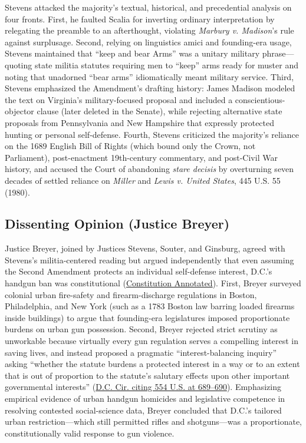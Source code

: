 \documentclass[12pt]{article}
\begin{document}
Stevens attacked the majority's textual, historical, and precedential analysis on four fronts. First, he faulted Scalia for inverting ordinary interpretation by relegating the preamble to an afterthought, violating \textit{Marbury v. Madison}'s rule against surplusage. Second, relying on linguistics amici and founding-era usage, Stevens maintained that ``keep and bear Arms'' was a unitary military phrase---quoting state militia statutes requiring men to ``keep'' arms ready for muster and noting that unadorned ``bear arms'' idiomatically meant military service. Third, Stevens emphasized the Amendment's drafting history: James Madison modeled the text on Virginia's military-focused proposal and included a conscientious-objector clause (later deleted in the Senate), while rejecting alternative state proposals from Pennsylvania and New Hampshire that expressly protected hunting or personal self-defense. Fourth, Stevens criticized the majority's reliance on the 1689 English Bill of Rights (which bound only the Crown, not Parliament), post-enactment 19th-century commentary, and post-Civil War history, and accused the Court of abandoning \textit{stare decisis} by overturning seven decades of settled reliance on \textit{Miller} and \textit{Lewis v. United States}, 445 U.S. 55 (1980).

\subsection{Dissenting Opinion (Justice Breyer)}
Justice Breyer, joined by Justices Stevens, Souter, and Ginsburg, agreed with Stevens's militia-centered reading but argued independently that even assuming the Second Amendment protects an individual self-defense interest, D.C.'s handgun ban was constitutional (\href{https://www.law.cornell.edu/constitution-conan/amendment-2/the-heller-decision-and-individual-right-to-firearms}{Constitution Annotated}). First, Breyer surveyed colonial urban fire-safety and firearm-discharge regulations in Boston, Philadelphia, and New York (such as a 1783 Boston law barring loaded firearms inside buildings) to argue that founding-era legislatures imposed proportionate burdens on urban gun possession. Second, Breyer rejected strict scrutiny as unworkable because virtually every gun regulation serves a compelling interest in saving lives, and instead proposed a pragmatic ``interest-balancing inquiry'' asking ``whether the statute burdens a protected interest in a way or to an extent that is out of proportion to the statute's salutary effects upon other important governmental interests'' (\href{https://www.judiciary.senate.gov/download/heller-v-district-of-columbia_-appendix-and-conclusion}{D.C. Cir. citing 554 U.S. at 689--690}). Emphasizing empirical evidence of urban handgun homicides and legislative competence in resolving contested social-science data, Breyer concluded that D.C.'s tailored urban restriction---which still permitted rifles and shotguns---was a proportionate, constitutionally valid response to gun violence.
\end{document}

